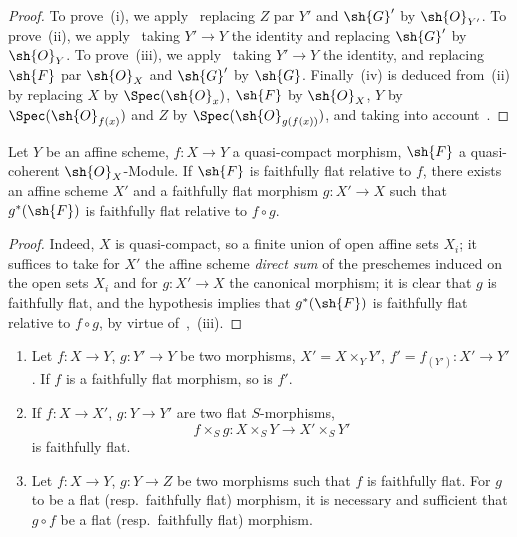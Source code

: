 \begin{proof}
To prove~(i), we apply~ replacing $Z$ par $Y'$ and $\sh{G}'$ by $\sh{O}_{Y'}$.
To prove~(ii), we apply~ taking $Y'\to Y$ the identity and replacing $\sh{G}'$ by $\sh{O}_Y$.
To prove~(iii), we apply~ taking $Y'\to Y$ the identity, and replacing $\sh{F}$ par $\sh{O}_X$ and $\sh{G}'$ by $\sh{G}$.
Finally~(iv) is deduced from~(ii) by replacing $X$ by $\Spec(\sh{O}_x)$, $\sh{F}$ by $\sh{O}_X$, $Y$ by $\Spec(\sh{O}_{f(x)})$ and $Z$ by $\Spec(\sh{O}_{g(f(x))})$, and taking into account~.
\end{proof}

\begin{corollary}[2.2.12]
\label{IV.2.2.12}
Let $Y$ be an affine scheme, $f:X\to Y$ a quasi-compact morphism,
$\sh{F}$ a quasi-coherent $\sh{O}_X$-Module.
If $\sh{F}$ is faithfully flat relative to $f$, there exists an affine scheme $X'$ and a faithfully flat morphism $g:X'\to X$ such that $g^*(\sh{F})$ is faithfully flat relative to $f\circ g$.
\end{corollary}

\begin{proof}
Indeed, $X$ is quasi-compact, so a finite union of open affine sets $X_i$; it suffices to take for $X'$ the affine scheme \emph{direct sum} of the preschemes induced on the open sets $X_i$ and for $g:X'\to X$ the canonical morphism; it is clear that $g$ is faithfully flat, and the hypothesis implies that $g^*(\sh{F})$ is faithfully flat relative to $f\circ g$, by virtue of~,~(iii).
\end{proof}

\begin{corollary}[2.2.13]
\label{IV.2.2.13}
\medskip\noindent
\begin{enumerate}[label=(\roman*)]
  \item Let $f:X\to Y$, $g:Y'\to Y$ be two morphisms, $X'=X\times_Y Y'$, $f'=f_{(Y')}:X'\to Y'$.
    If $f$ is a faithfully flat morphism, so is $f'$.
  \item If $f:X\to X'$, $g:Y\to Y'$ are two flat $S$-morphisms,
    \[
      f\times_S g: X\times_S Y \to X'\times_S Y'
    \]
    is faithfully flat.
  \item Let $f:X\to Y$, $g:Y\to Z$ be two morphisms such that $f$ is faithfully flat.
    For $g$ to be a flat \textnormal{(}resp.\ faithfully flat\textnormal{)} morphism, it is necessary and sufficient that $g\circ f$ be a flat \textnormal{(}resp.\ faithfully flat\textnormal{)} morphism.
\end{enumerate}
\end{corollary}

